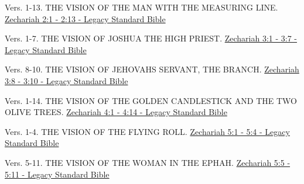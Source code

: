 \documentclass[
  ignorenonframetext,
]{beamer}
\begin{document}
\begin{frame}{2}
\label{section-135}
\begin{block}{Vers. 1-13. THE VISION OF THE MAN WITH THE MEASURING
LINE.}
\label{vers.-1-13.-the-vision-of-the-man-with-the-measuring-line.}
\href{https://read.lsbible.org/?q=zech2\%3A1-13}{Zechariah 2:1 - 2:13 -
Legacy Standard Bible}
\end{block}
\end{frame}

\begin{frame}{3}
\label{section-136}
\begin{block}{Vers. 1-7. THE VISION OF JOSHUA THE HIGH PRIEST.}
\label{vers.-1-7.-the-vision-of-joshua-the-high-priest.}
\href{https://read.lsbible.org/?q=zech3\%3A1-7}{Zechariah 3:1 - 3:7 -
Legacy Standard Bible}
\end{block}

\begin{block}{Vers. 8-10. THE VISION OF JEHOVAH\textquotesingle S
SERVANT, THE BRANCH.}
\label{vers.-8-10.-the-vision-of-jehovahs-servant-the-branch.}
\href{https://read.lsbible.org/?q=zech3\%3A8-10}{Zechariah 3:8 - 3:10 -
Legacy Standard Bible}
\end{block}
\end{frame}

\begin{frame}{4}
\label{section-137}
\begin{block}{Vers. 1-14. THE VISION OF THE GOLDEN CANDLESTICK AND THE
TWO OLIVE TREES.}
\label{vers.-1-14.-the-vision-of-the-golden-candlestick-and-the-two-olive-trees.}
\href{https://read.lsbible.org/?q=zech4\%3A1-14}{Zechariah 4:1 - 4:14 -
Legacy Standard Bible}
\end{block}
\end{frame}

\begin{frame}{5}
\label{section-138}
\begin{block}{Vers. 1-4. THE VISION OF THE FLYING ROLL.}
\label{vers.-1-4.-the-vision-of-the-flying-roll.}
\href{https://read.lsbible.org/?q=zech5\%3A1-4}{Zechariah 5:1 - 5:4 -
Legacy Standard Bible}
\end{block}

\begin{block}{Vers. 5-11. THE VISION OF THE WOMAN IN THE EPHAH.}
\label{vers.-5-11.-the-vision-of-the-woman-in-the-ephah.}
\href{https://read.lsbible.org/?q=zech5\%3A5-11}{Zechariah 5:5 - 5:11 -
Legacy Standard Bible}
\end{block}
\end{frame}
\end{document}
